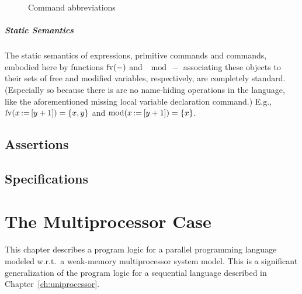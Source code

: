 \documentclass[11pt]{report}
\begin{document}
\begin{figure}[ht]
    \centering
    \caption{\label{fig:sequential-command-abbreviations} Command abbreviations}
\end{figure}

\paragraph{Static Semantics} The static semantics of expressions, primitive commands and commands, embodied here by functions $\mathrm{fv}(-)$ and $\mod{-}$ associating these objects to their sets of free and modified variables, respectively, are completely standard. (Especially so because there is are no name-hiding operations in the language, like the aforementioned missing local variable declaration command.) E.g., $\mathrm{fv}(x \operatorname{:\!=} \left[ y+1 \right]) = \left\lbrace x,y \right\rbrace$ and $\mathrm{mod}(x \operatorname{:\!=} \left[ y+1 \right]) = \left\lbrace x \right\rbrace$.  

\section{Assertions}
\label{sec:sequential-assertions}

\section{Specifications}
\label{sec:sequential-specification}

\chapter{The Multiprocessor Case}
\label{ch:multiprocessor}

This chapter describes a program logic for a parallel programming language modeled w.r.t.\ a weak-memory multiprocessor system model. This is a significant generalization of the program logic for a sequential language described in Chapter~\ref{ch:uniprocessor}. 
\end{document}
